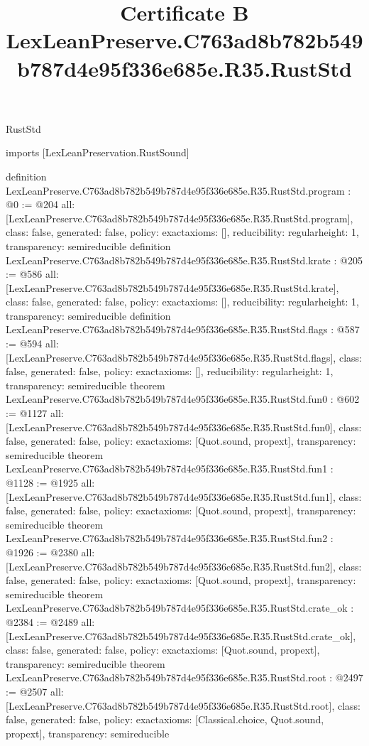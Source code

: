 \begin{lexlean}{RustStd}
\title{Certificate B LexLeanPreserve.C763ad8b782b549b787d4e95f336e685e.R35.RustStd}
\begin{coremodule}
imports [LexLeanPreservation.RustSound]

definition LexLeanPreserve.C763ad8b782b549b787d4e95f336e685e.R35.RustStd.program : @0 := @204 {
  all: [LexLeanPreserve.C763ad8b782b549b787d4e95f336e685e.R35.RustStd.program],
  class: false,
  generated: false,
  policy: exact{axioms: []},
  reducibility: regular{height: 1},
  transparency: semireducible
}
definition LexLeanPreserve.C763ad8b782b549b787d4e95f336e685e.R35.RustStd.krate : @205 := @586 {
  all: [LexLeanPreserve.C763ad8b782b549b787d4e95f336e685e.R35.RustStd.krate],
  class: false,
  generated: false,
  policy: exact{axioms: []},
  reducibility: regular{height: 1},
  transparency: semireducible
}
definition LexLeanPreserve.C763ad8b782b549b787d4e95f336e685e.R35.RustStd.flags : @587 := @594 {
  all: [LexLeanPreserve.C763ad8b782b549b787d4e95f336e685e.R35.RustStd.flags],
  class: false,
  generated: false,
  policy: exact{axioms: []},
  reducibility: regular{height: 1},
  transparency: semireducible
}
theorem LexLeanPreserve.C763ad8b782b549b787d4e95f336e685e.R35.RustStd.fun0 : @602 := @1127 {
  all: [LexLeanPreserve.C763ad8b782b549b787d4e95f336e685e.R35.RustStd.fun0],
  class: false,
  generated: false,
  policy: exact{axioms: [Quot.sound, propext]},
  transparency: semireducible
}
theorem LexLeanPreserve.C763ad8b782b549b787d4e95f336e685e.R35.RustStd.fun1 : @1128 := @1925 {
  all: [LexLeanPreserve.C763ad8b782b549b787d4e95f336e685e.R35.RustStd.fun1],
  class: false,
  generated: false,
  policy: exact{axioms: [Quot.sound, propext]},
  transparency: semireducible
}
theorem LexLeanPreserve.C763ad8b782b549b787d4e95f336e685e.R35.RustStd.fun2 : @1926 := @2380 {
  all: [LexLeanPreserve.C763ad8b782b549b787d4e95f336e685e.R35.RustStd.fun2],
  class: false,
  generated: false,
  policy: exact{axioms: [Quot.sound, propext]},
  transparency: semireducible
}
theorem LexLeanPreserve.C763ad8b782b549b787d4e95f336e685e.R35.RustStd.crate_ok : @2384 := @2489 {
  all: [LexLeanPreserve.C763ad8b782b549b787d4e95f336e685e.R35.RustStd.crate_ok],
  class: false,
  generated: false,
  policy: exact{axioms: [Quot.sound, propext]},
  transparency: semireducible
}
theorem LexLeanPreserve.C763ad8b782b549b787d4e95f336e685e.R35.RustStd.root : @2497 := @2507 {
  all: [LexLeanPreserve.C763ad8b782b549b787d4e95f336e685e.R35.RustStd.root],
  class: false,
  generated: false,
  policy: exact{axioms: [Classical.choice, Quot.sound, propext]},
  transparency: semireducible
}


\end{coremodule}
\end{lexlean}
